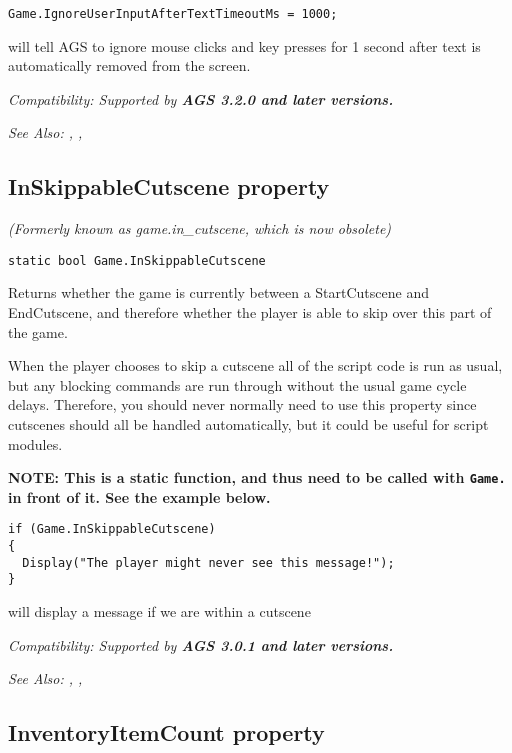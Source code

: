 \begin{verbatim}
Game.IgnoreUserInputAfterTextTimeoutMs = 1000;
\end{verbatim}
will tell AGS to ignore mouse clicks and key presses for 1 second after text is automatically
removed from the screen.

\it{Compatibility:} Supported by \bf{AGS 3.2.0} and later versions.

\it{See Also:} ,
, 


\subsection{InSkippableCutscene property}\label{Game.InSkippableCutscene}%

\it{(Formerly known as game.in_cutscene, which is now obsolete)}

\begin{verbatim}
static bool Game.InSkippableCutscene
\end{verbatim}
Returns whether the game is currently between a StartCutscene and EndCutscene, and therefore
whether the player is able to skip over this part of the game.

When the player chooses to skip a cutscene all of the script code is run as usual,
but any blocking commands are run through without the usual game cycle delays. Therefore, you
should never normally need to use this property since cutscenes should all be handled automatically,
but it could be useful for script modules.

\bf{NOTE:} This is a static function, and thus need to be called with \verb$Game.$ in front of it. See
the example below.

\begin{verbatim}
if (Game.InSkippableCutscene)
{
  Display("The player might never see this message!");
}
\end{verbatim}
will display a message if we are within a cutscene

\it{Compatibility:} Supported by \bf{AGS 3.0.1} and later versions.

\it{See Also:} , ,


\subsection{InventoryItemCount property}\label{Game.InventoryItemCount}%

